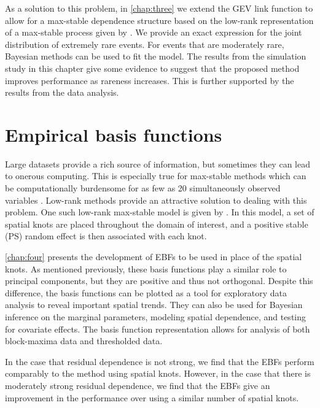 As a solution to this problem, in \cref{chap:three} we extend the GEV link function \citep{Wang2010} to allow for a max-stable dependence structure based on the low-rank representation of a max-stable process given by \citet{Reich2012}.
We provide an exact expression for the joint distribution of extremely rare events.
For events that are moderately rare, Bayesian methods can be used to fit the model.
The results from the simulation study in this chapter give some evidence to suggest that the proposed method improves performance as rareness increases.
This is further supported by the results from the data analysis.

\section{Empirical basis functions}

Large datasets provide a rich source of information, but sometimes they can lead to onerous computing.
This is especially true for max-stable methods which can be computationally burdensome for as few as 20 simultaneously observed variables \citep{Wadsworth2014}.
Low-rank methods provide an attractive solution to dealing with this problem.
One such low-rank max-stable model is given by \citet{Reich2012}.
In this model, a set of spatial knots are placed throughout the domain of interest, and a positive stable (PS) random effect is then associated with each knot.

\cref{chap:four} presents the development of EBFs to be used in place of the spatial knots.
As mentioned previously, these basis functions play a similar role to principal components, but they are positive and thus not orthogonal.
Despite this difference, the basis functions can be plotted as a tool for exploratory data analysis to reveal important spatial trends.
They can also be used for Bayesian inference on the marginal parameters, modeling spatial dependence, and testing for covariate effects.
The basis function representation allows for analysis of both block-maxima data and thresholded data.

In the case that residual dependence is not strong, we find that the EBFs perform comparably to the method using spatial knots.
However, in the case that there is moderately strong residual dependence, we find that the EBFs give an improvement in the performance over using a similar number of spatial knots.